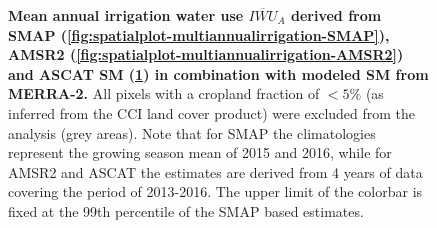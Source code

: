 \documentclass[hess, manuscript]{copernicus}
\begin{document}
\begin{figure}
\begin{subfigure}[t]{0.52\textwidth}
   	   \caption{}
       \label{fig:spatialplot-multiannualirrigation-ASCAT}
   \end{subfigure}
   \caption{\textbf{Mean annual irrigation water use $\overline{IWU}_{A}$ derived from SMAP (\ref{fig:spatialplot-multiannualirrigation-SMAP}), AMSR2 (\ref{fig:spatialplot-multiannualirrigation-AMSR2}) and ASCAT SM (\ref{fig:spatialplot-multiannualirrigation-ASCAT}) in combination with modeled SM from MERRA-2.} All pixels with a cropland fraction of $< 5\%$ (as inferred from the CCI land cover product) were excluded from the analysis (grey areas). Note that for SMAP the climatologies represent the growing season mean of 2015 and 2016, while for AMSR2 and ASCAT the estimates are derived from 4 years of data covering the period of 2013-2016. The upper limit of the colorbar is fixed at the 99th percentile of the SMAP based estimates.}
   \label{fig:spatialplot-multiannualirrigation}
\end{figure}
\clearpage
\end{document}

